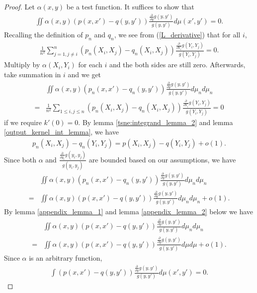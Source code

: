 \begin{proof}
    Let $\alpha(x,y)$ be a test function. It suffices to show that
    \begin{align}
        \iint \alpha(x,y)(p(x,x')-q(y,y')) \frac{\frac{\partial}{\partial y}g(y,y')}{g(y,y')} d\mu(x',y') = 0.
    \end{align}
    Recalling the definition of $p_n$ and $q_n$, we see from (\ref{L_derivative}) that for all $i$,
    \begin{align}
        \frac{1}{n^2}\sum_{j=1,j \neq i}^n (p_n(X_i,X_j)-q_n(X_i,X_j)) \frac{\frac{\partial}{\partial Y_i}g(Y_i,Y_j)}{g(Y_i,Y_j)} = 0.
    \end{align}
    Multiply by $\alpha(X_i,Y_i)$ for each $i$ and the both sides are still zero. Afterwards, take summation in $i$ and we get
    \begin{align}
          & \iint \alpha(x,y)(p_n(x,x')-q_n(y,y')) \frac{\frac{\partial}{\partial y}g(y,y')}{g(y,y')} d\mu_n d\mu_n \nonumber                \\
        = & \frac{1}{n^2}\sum_{1 \leq i,j \leq n} (p_n(X_i,X_j)-q_n(X_i,X_j)) \frac{\frac{\partial}{\partial Y_i}g(Y_i,Y_j)}{g(Y_i,Y_j)} = 0
    \end{align}
    if we require $k'(0) = 0$.
    By lemma \ref{tsne:integrand_lemma_2} and lemma \ref{output_kernel_int_lemma}, we have
    \begin{align}
        p_n(X_i,X_j)-q_n(Y_i,Y_j) = p(X_i,X_j)-q(Y_i,Y_j) + o(1).
    \end{align}
    Since both $\alpha$ and $\frac{\frac{\partial}{\partial y_i}g(y_i,y_j)}{g(y_i,y_j)}$ are bounded based on our assumptions, we have
    \begin{align}
          & \iint \alpha(x,y)(p_n(x,x')-q_n(y,y')) \frac{\frac{\partial}{\partial y}g(y,y')}{g(y,y')} d\mu_n d\mu_n \nonumber \\
        = & \iint \alpha(x,y)(p(x,x')-q(y,y')) \frac{\frac{\partial}{\partial y}g(y,y')}{g(y,y')} d\mu_n d\mu_n + o(1).
    \end{align}
    By lemma \ref{appendix_lemma_1} and lemma \ref{appendix_lemma_2} below we have
    \begin{align}
          & \iint \alpha(x,y)(p(x,x')-q(y,y')) \frac{\frac{\partial}{\partial y}g(y,y')}{g(y,y')} d\mu_n d\mu_n \nonumber \\
        = & \iint \alpha(x,y)(p(x,x')-q(y,y')) \frac{\frac{\partial}{\partial y}g(y,y')}{g(y,y')} d\mu d\mu + o(1).
    \end{align}
    Since $\alpha$ is an arbitrary function,
    \begin{align}
        \int (p(x,x')-q(y,y')) \frac{\frac{\partial}{\partial y}g(y,y')}{g(y,y')} d\mu(x',y') = 0.
    \end{align}
\end{proof}
